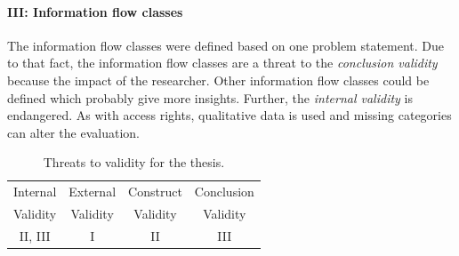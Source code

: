 \paragraph{III: Information flow classes}
The information flow classes were defined based on one problem statement. Due to that fact, the information flow classes are a threat to the \textit{conclusion validity} because the impact of the researcher. Other information flow classes could be defined which probably give more insights. Further, the \textit{internal validity} is endangered. As with access rights, qualitative data is used and missing categories can alter the evaluation.
\begin{table}
\begin{tabular}{|c|c|c|c|}
\hline 
Internal & External & Construct & Conclusion \\ 
Validity & Validity & Validity & Validity\\
\hline 
II, III & I & II & III \\ 
\hline 
\end{tabular} 
\caption{Threats to validity for the thesis.}
\label{TtoV_sum}
\end{table}
